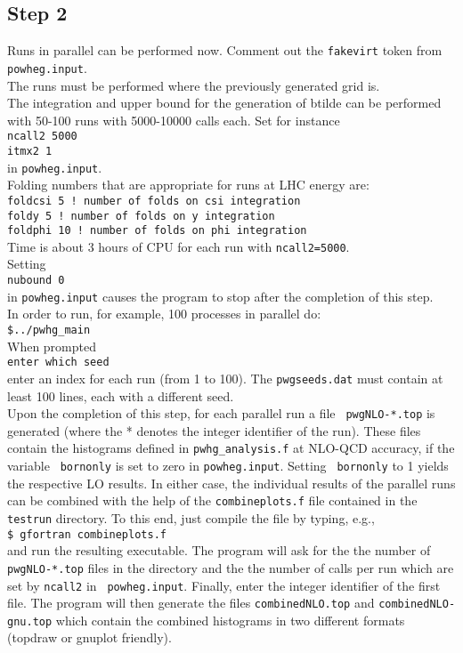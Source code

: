 \documentclass[a4paper,11pt]{article}
\begin{document}
\subsection*{Step 2}
%
Runs in parallel can be performed now. Comment out the {\tt fakevirt}
token from {\tt powheg.input}.
\\[2ex]
The runs must be performed where the previously generated grid is.
\\[2ex]
The integration and upper bound for the generation of btilde can be
performed with 50-100 runs with 5000-10000 calls each. Set for
instance
\\[2ex]
{\tt ncall2 5000}
\\[2ex]
{\tt itmx2 1}
\\[2ex]
in {\tt powheg.input}.
\\[2ex]
Folding numbers that are appropriate for runs at LHC energy are:
\\[2ex]
{\tt foldcsi 5 ! number of folds on csi integration}
\\[2ex]
{\tt foldy 5 ! number of folds on y integration}
\\[2ex]
{\tt foldphi 10 ! number of folds on phi integration}
\\[2ex]
Time is about 3 hours of CPU for each run with {\tt ncall2=5000}.
\\[2ex]
Setting
\\[2ex]
{\tt nubound 0}
\\[2ex]
in {\tt powheg.input} causes the program to stop after the completion
of this step.
\\[2ex]
In order to run, for example, 100 processes in parallel do:
\\[2ex]
{\tt \$../pwhg\_main}
\\[2ex]
When prompted
\\[2ex]
{\tt enter which seed}
\\[2ex]
enter an index for each run (from 1 to 100). The {\tt pwgseeds.dat}
must contain at least 100 lines, each with a different seed.
\\[2ex]
Upon the completion of this step, for each parallel run a file {\tt
  pwgNLO-*.top} is generated (where the * denotes the integer
identifier of the run).  These files contain the histograms defined in
{\tt pwhg\_analysis.f} at NLO-QCD accuracy, if the variable {\tt
  bornonly} is set to zero in {\tt powheg.input}.  Setting {\tt
  bornonly} to 1 yields the respective LO results. In either case, the
individual results of the parallel runs can be combined with the help
of the {\tt combineplots.f} file contained in the {\tt testrun}
directory.  To this end, just compile the file by typing, e.g.,
\\[2ex]
{\tt \$ gfortran combineplots.f}
\\[2ex]
and run the resulting executable. The program will ask for the the
number of {\tt pwgNLO-*.top} files in the directory and the the number
of calls per run which are set by {\tt ncall2} in {\tt
  powheg.input}. Finally, enter the integer identifier of the first
file. The program will then generate the files {\tt combinedNLO.top}
and {\tt combinedNLO-gnu.top} which contain the combined histograms
in two different formats (topdraw or gnuplot friendly). 
\end{document}
